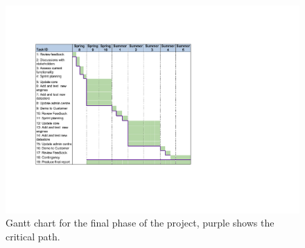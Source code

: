 \begin{figure}[ht!]
  \centering
  \includegraphics[width= 12cm]{images/GantFinal.pdf}
  \caption{Gantt chart for the final phase of the project, purple shows the critical path.}
  \label{fig:ganttFinal}
\end{figure}
